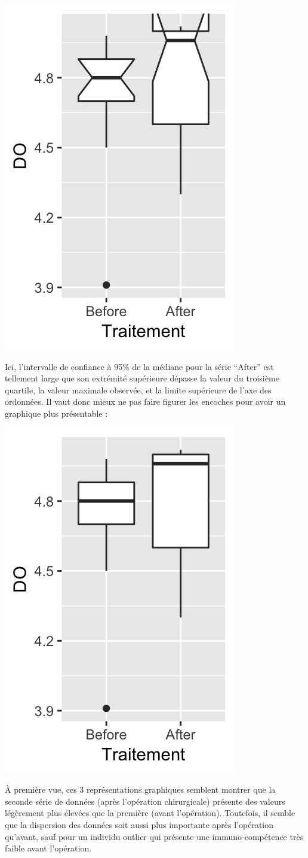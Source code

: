 \documentclass[a4paperpaper,]{article}
\newenvironment{Shaded}{\begin{snugshade}}{\end{snugshade}}
\newcommand{\DataTypeTok}[1]{\textcolor[rgb]{0.00,0.34,0.68}{#1}}
\newcommand{\KeywordTok}[1]{\textcolor[rgb]{0.12,0.11,0.11}{\textbf{#1}}}
\newcommand{\NormalTok}[1]{\textcolor[rgb]{0.12,0.11,0.11}{#1}}
\newcommand{\OperatorTok}[1]{\textcolor[rgb]{0.12,0.11,0.11}{#1}}
\newcommand{\StringTok}[1]{\textcolor[rgb]{0.75,0.01,0.01}{#1}}
\begin{document}
\begin{center}\includegraphics[width=0.25\linewidth]{figure/unnamed-chunk-35-1} \end{center}

Ici, l'intervalle de confiance à 95\% de la médiane pour la série ``After'' est tellement large que son extrémité supérieure dépasse la valeur du troisième quartile, la valeur maximale observée, et la limite supérieure de l'axe des ordonnées. Il vaut donc mieux ne pas faire figurer les encoches pour avoir un graphique plus présentable :

\begin{Shaded}
\end{Shaded}

\begin{center}\includegraphics[width=0.25\linewidth]{figure/unnamed-chunk-36-1} \end{center}

À première vue, ces 3 représentations graphiques semblent montrer que la seconde série de données (après l'opération chirurgicale) présente des valeurs légèrement plus élevées que la première (avant l'opération). Toutefois, il semble que la dispersion des données soit aussi plus importante après l'opération qu'avant, sauf pour un individu outlier qui présente une immuno-compétence très faible avant l'opération.
\end{document}
